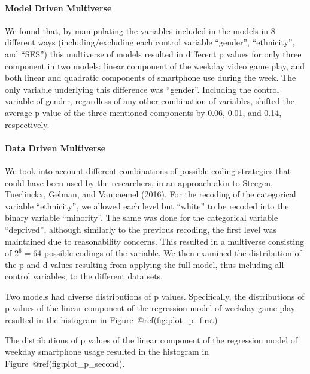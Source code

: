 \documentclass[floatsintext,man]{apa6}
\theoremstyle{definition}
\theoremstyle{definition}
\theoremstyle{definition}
\theoremstyle{remark}
\begin{document}
\hypertarget{model-driven-multiverse}{%
\paragraph{Model Driven Multiverse}\label{model-driven-multiverse}}

We found that, by manipulating the variables included in the models in 8
different ways (including/excluding each control variable
\enquote{gender}, \enquote{ethnicity}, and \enquote{SES}) this
multiverse of models resulted in different p values for only three
component in two models: linear component of the weekday video game
play, and both linear and quadratic components of smartphone use during
the week. The only variable underlying this difference was
\enquote{gender}. Including the control variable of gender, regardless
of any other combination of variables, shifted the average p value of
the three mentioned components by 0.06, 0.01, and 0.14, respectively.

\hypertarget{data-driven-multiverse}{%
\paragraph{Data Driven Multiverse}\label{data-driven-multiverse}}

We took into account different combinations of possible coding
strategies that could have been used by the researchers, in an approach
akin to Steegen, Tuerlinckx, Gelman, and Vanpaemel (2016). For the
recoding of the categorical variable \enquote{ethnicity}, we allowed
each level but \enquote{white} to be recoded into the binary variable
\enquote{minority}. The same was done for the categorical variable
\enquote{deprived}, although similarly to the previous recoding, the
first level was maintained due to reasonability concerns. This resulted
in a multiverse consisting of \(2^6 = 64\) possible codings of the
variable. We then examined the distribution of the p and d values
resulting from applying the full model, thus including all control
variables, to the different data sets.

Two models had diverse distributions of p values. Specifically, the
distributions of p values of the linear component of the regression
model of weekday game play resulted in the histogram in
Figure~@ref(fig:plot\_p\_first)

The distributions of p values of the linear component of the regression
model of weekday smartphone usage resulted in the histogram in
Figure~@ref(fig:plot\_p\_second).
\end{document}
